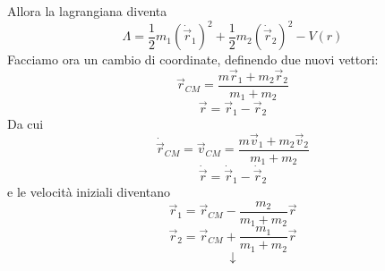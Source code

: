 \documentclass[a4paper,openany]{article}
\begin{document}
	Allora la lagrangiana diventa
	\begin{equation}\label{key}
		\Lambda=  \dfrac{1}{2}m_1(\dot{\vec{r}}_{1})^{2} + \dfrac{1}{2}m_2(\dot{\vec{r}}_{2})^{2} - V(r)
	\end{equation}
	Facciamo ora un cambio di coordinate, definendo due nuovi vettori:
	\begin{equation*}\label{key}
		\vec{r}_{CM} = \dfrac{m\vec{r}_1+m_2\vec{r}_2}{m_1+m_2} 
	\end{equation*}
	\begin{equation*}\label{key}
		\vec{r} = \vec{r}_1 - \vec{r}_2
	\end{equation*}
	Da cui
	\begin{equation}\label{key}
		\dot{\vec{r}}_{CM} = \vec{v}_{CM} = \dfrac{m\vec{v}_1+m_2\vec{v}_2}{m_1+m_2} 
	\end{equation}
	\begin{equation*}\label{key}
		\dot{\vec{r}} = \dot{\vec{r}}_1 - \dot{\vec{r}}_2
	\end{equation*}
	e le velocità iniziali diventano
	\begin{equation}
		\vec{r}_1 = \vec{r}_{CM} - \dfrac{m_2}{m_1+m_2}\vec{r}
		\label{trasfRaggio}
	\end{equation}
	\begin{equation*}\label{key}
		\vec{r}_2 = \vec{r}_{CM} + \dfrac{m_1}{m_1+m_2}\vec{r}
	\end{equation*}
	$$
	\downarrow
	$$
	
\end{document}

